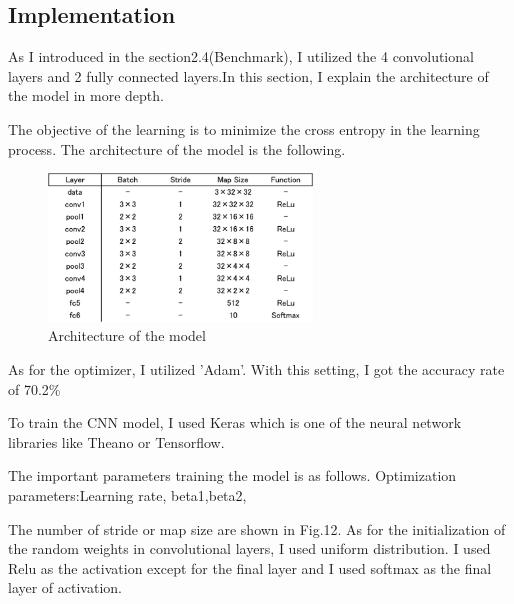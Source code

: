 \subsection{Implementation}


As I introduced in the section2.4(Benchmark), I utilized the 4 convolutional layers and 2 fully connected layers.In this section, I explain the architecture of the model in more depth.

The objective of the learning is to minimize the cross entropy in the learning process.
The architecture of the model is the following.

 \begin{figure}[H]

	\begin{center}
	\includegraphics[width=7cm]{picture/layer_architecture.png}
	\caption{Architecture of the model}
	\end{center}
	\label{fig:9}

\end{figure}


As for the optimizer, I utilized 'Adam'.
With this setting, I got the accuracy rate of 70.2\%

To train the CNN model, I used Keras which is one of the neural network libraries like Theano or Tensorflow.

The important parameters training the model is as follows.
Optimization parameters:Learning rate, beta1,beta2, 

The number of stride or map size are shown in Fig.12.
As for the initialization of the random weights in convolutional layers, I used uniform distribution.
I used Relu as the activation except for the final layer and I used softmax as the final layer of activation.